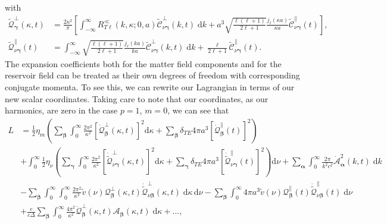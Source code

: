 \documentclass{article}
\begin{document}
with
\begin{equation}
\begin{split}
\tilde{\mathcal{Q}}_{\bm{\gamma}}^\perp(\kappa,t) &= \frac{2\kappa^2}{\pi}\left[\int_{-\infty}^\infty R_{T\ell}^\ll(k,\kappa;0,a)\tilde{\mathcal{C}}_{\nu\bm{\gamma}}^\perp(k,t)\;\mathrm{d}k + a^3\sqrt{\frac{\ell(\ell + 1)}{2\ell + 1}}\frac{j_\ell(\kappa a)}{\kappa a}\tilde{\mathcal{C}}_{\nu\bm{\gamma}}^\parallel(t)\right],\\
\tilde{\mathcal{Q}}_{\nu\bm{\gamma}}^\parallel(t) &= \int_{-\infty}^\infty\sqrt{\frac{\ell(\ell + 1)}{2\ell + 1}}\frac{j_\ell(ka)}{ka}\tilde{\mathcal{C}}_{\nu\bm{\gamma}}^\perp(k,t)\;\mathrm{d}k + \frac{\ell}{2\ell + 1}\tilde{\mathcal{C}}_{\nu\bm{\gamma}}^\parallel(t).
\end{split}
\end{equation}
The expansion coefficients both for the matter field components and for the reservoir field can be treated as their own degrees of freedom with corresponding conjugate momenta. To see this, we can rewrite our Lagrangian in terms of our new scalar coordinates. Taking care to note that our coordinates, as our harmonics, are zero in the case $p=1$, $m=0$, we can see that 
\begin{equation}
\begin{split}
L &= \frac{1}{2}\eta_m\left(\sum_{\bm{\beta}}\int_0^\infty\frac{2\pi^2}{\kappa^2}\left[\dot{\mathcal{Q}}_{\bm{\beta}}^\perp(\kappa,t)\right]^2\mathrm{d}\kappa + \sum_{\bm{\beta}}\delta_{TE}4\pi a^3\left[\dot{\mathcal{Q}}_{\bm{\beta}}^\parallel(t)\right]^2\right)\\
&+ \int_0^\infty\frac{1}{2}\eta_\nu\left(\sum_{\bm{\gamma}}\int_0^\infty\frac{2\pi^2}{\kappa^2}\left[\dot{\tilde{\mathcal{Q}}}_{\nu\bm{\gamma}}^\perp(\kappa,t)\right]^2\mathrm{d}\kappa + \sum_{\bm{\gamma}}\delta_{TE}4\pi a^3\left[\dot{\tilde{\mathcal{Q}}}_{\nu\bm{\gamma}}^\parallel(t)\right]^2\right)\mathrm{d}\nu + \sum_{\bm{\alpha}}\int_{0}^\infty\frac{2\pi}{k^2c^2}\dot{\mathcal{A}}_{\bm{\alpha}}^2(k,t)\;\mathrm{d}k\\
&- \sum_{\bm{\beta}}\int_0^\infty\int_0^\infty\frac{2\pi^2}{\kappa^2}\tilde{v}(\nu)\mathcal{Q}_{\bm{\beta}}^\perp(\kappa,t)\dot{\tilde{\mathcal{Q}}}_{\nu\bm{\beta}}^\perp(\kappa,t)\;\mathrm{d}\kappa\,\mathrm{d}\nu - \sum_{\bm{\beta}}\int_0^\infty 4\pi a^3\tilde{v}(\nu)\mathcal{Q}_{\bm{\beta}}^\parallel(t)\dot{\tilde{\mathcal{Q}}}_{\nu\bm{\beta}}^\parallel(t)\;\mathrm{d}\nu\\
&+ \frac{e}{c\Delta}\sum_{\bm{\beta}}\int_0^\infty\frac{4\pi^2}{\kappa^2}\dot{\mathcal{Q}}_{\bm{\beta}}^\perp(\kappa,t)\mathcal{A}_{\bm{\beta}}(\kappa,t)\;\mathrm{d}\kappa + \ldots,
\end{split}
\end{equation}
\end{document}
